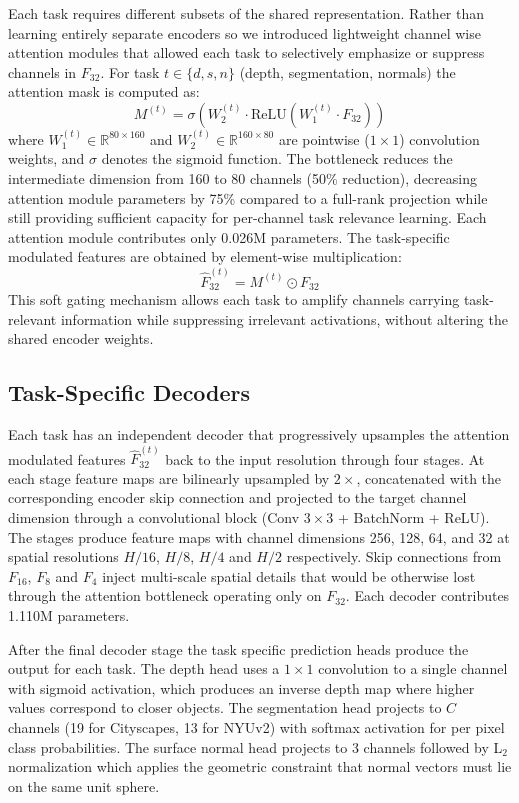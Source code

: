 \documentclass[journal, onecolumn]{IEEEtran}
\begin{document}
Each task requires different subsets of the shared representation. Rather than learning entirely separate encoders so we introduced lightweight channel wise attention modules that allowed each task to selectively emphasize or suppress channels in $F_{32}$. For task $t \in \{d, s, n\}$ (depth, segmentation, normals) the attention mask is computed as:
\begin{equation}
M^{(t)} = \sigma\left(W_2^{(t)} \cdot \text{ReLU}\left(W_1^{(t)} \cdot F_{32}\right)\right)
\end{equation}
where $W_1^{(t)} \in \mathbb{R}^{80 \times 160}$ and $W_2^{(t)} \in \mathbb{R}^{160 \times 80}$ are pointwise ($1 \times 1$) convolution weights, and $\sigma$ denotes the sigmoid function. The bottleneck reduces the intermediate dimension from 160 to 80 channels (50\% reduction), decreasing attention module parameters by 75\% compared to a full-rank projection while still providing sufficient capacity for per-channel task relevance learning. Each attention module contributes only 0.026M parameters. The task-specific modulated features are obtained by element-wise multiplication:
\begin{equation}
\hat{F}_{32}^{(t)} = M^{(t)} \odot F_{32}
\end{equation}
This soft gating mechanism allows each task to amplify channels carrying task-relevant information while suppressing irrelevant activations, without altering the shared encoder weights.

\subsection{Task-Specific Decoders}

Each task has an independent decoder that progressively upsamples the attention modulated features $\hat{F}_{32}^{(t)}$ back to the input resolution through four stages. At each stage feature maps are bilinearly upsampled by $2\times$, concatenated with the corresponding encoder skip connection and projected to the target channel dimension through a convolutional block (Conv $3\times3$ + BatchNorm + ReLU). The stages produce feature maps with channel dimensions 256, 128, 64, and 32 at spatial resolutions $H/16$, $H/8$, $H/4$ and $H/2$ respectively. Skip connections from $F_{16}$, $F_8$ and $F_4$ inject multi-scale spatial details that would be otherwise lost through the attention bottleneck operating only on $F_{32}$. Each decoder contributes 1.110M parameters.

After the final decoder stage the task specific prediction heads produce the output for each task. The depth head uses a $1 \times 1$ convolution to a single channel with sigmoid activation, which produces an inverse depth map where higher values correspond to closer objects. The segmentation head projects to $C$ channels (19 for Cityscapes, 13 for NYUv2) with softmax activation for per pixel class probabilities. The surface normal head projects to 3 channels followed by L$_2$ normalization which applies the geometric constraint that normal vectors must lie on the same unit sphere.
\end{document}

